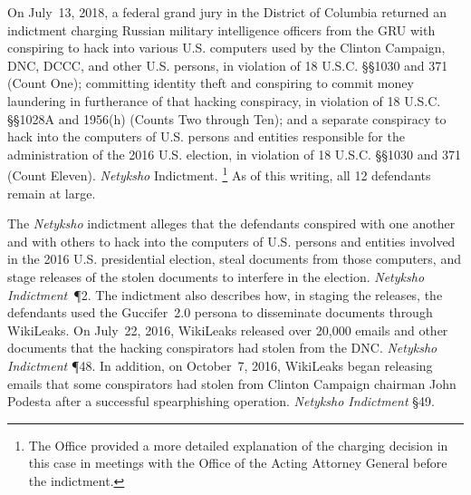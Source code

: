 On July~13, 2018, a federal grand jury in the District of Columbia returned an indictment charging Russian military intelligence officers from the GRU with conspiring to hack into various U.S. computers used by the Clinton Campaign, DNC, DCCC, and other U.S. persons, in violation of 18 U.S.C. \S\S 1030 and 371 (Count One); committing identity theft and conspiring to commit money laundering in furtherance of that hacking conspiracy, in violation of 18 U.S.C. \S\S 1028A and 1956(h) (Counts Two through Ten); and a separate conspiracy to hack into the computers of U.S. persons and entities responsible for the administration of the 2016 U.S. election, in violation of 18 U.S.C. \S\S 1030 and 371 (Count Eleven).
\textit{Netyksho} Indictment.%
\footnote{The Office provided a more detailed explanation of the charging decision in this case in meetings with the Office of the Acting Attorney General before the indictment.}
As of this writing, all 12 defendants remain at large.

The \textit{Netyksho} indictment alleges that the defendants conspired with one another and with others to hack into the computers of U.S. persons and entities involved in the 2016 U.S. presidential election, steal documents from those computers, and stage releases of the stolen documents to interfere in the election.
\textit{Netyksho Indictment}~\P 2.
The indictment also describes how, in staging the releases, the defendants used the Guccifer~2.0 persona to disseminate documents through WikiLeaks.
On July~22, 2016, WikiLeaks released over 20,000 emails and other documents that the hacking conspirators had stolen from the DNC\null.
\textit{Netyksho Indictment} \P 48.
In addition, on October~7, 2016, WikiLeaks began releasing emails that some conspirators had stolen from Clinton Campaign chairman John Podesta after a successful spearphishing operation.
\textit{Netyksho Indictment} \S 49.




